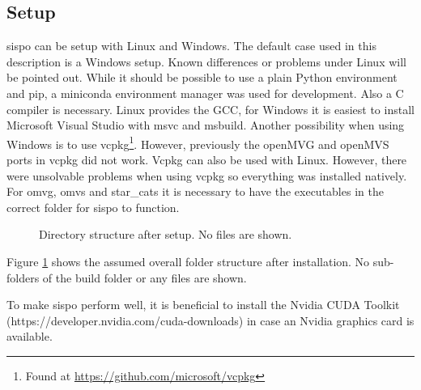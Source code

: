 \subsection{Setup} \label{sec:setup}
\gls{sispo} can be setup with Linux and Windows. The default case used in this description is a Windows setup. Known differences or problems under Linux will be pointed out. While it should be possible to use a plain Python environment and pip, a miniconda environment manager was used for development. Also a C compiler is necessary. Linux provides the GCC, for Windows it is easiest to install Microsoft Visual Studio with \gls{msvc} and \gls{msbuild}. Another possibility when using Windows is to use vcpkg\footnote{Found at \url{https://github.com/microsoft/vcpkg}}. However, previously the openMVG and openMVS ports in vcpkg did not work. Vcpkg can also be used with Linux. However, there were unsolvable problems when using vcpkg so everything was installed natively.
For \gls{omvg}, \gls{omvs} and star\_cats it is necessary to have the executables in the correct folder for \gls{sispo} to function.\newline

\begin{figure}
    \caption{Directory structure after setup. No files are shown.}
    \label{fig:dir_tree}
\end{figure}
Figure \ref{fig:dir_tree} shows the assumed overall folder structure after installation. No sub-folders of the build folder or any files are shown.

To make \gls{sispo} perform well, it is beneficial to install the Nvidia CUDA Toolkit (https://developer.nvidia.com/cuda-downloads) in case an Nvidia graphics card is available.

